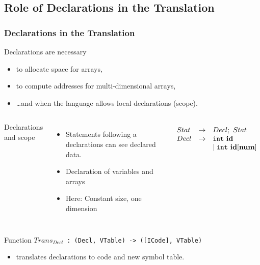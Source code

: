 \documentclass{beamer}
\newcommand{\codesize}{\footnotesize}
\newcommand{\cd}[1]{{{\codesize\tt #1}}}
\renewcommand{\emph}[1]{\textcolor{structure}{#1}}
\begin{document}
\subsection{Role of Declarations in the Translation}

\begin{frame}
	\tableofcontents[currentsubsection]
\end{frame}


\begin{frame}[fragile]
	\frametitle{Declarations in the Translation}

\emph{Declarations are necessary}

\begin{itemize}
\item to allocate space for arrays,
\item to compute addresses for multi-dimensional arrays,
\item \ldots and when the language allows \emph{local declarations (scope)}.
\end{itemize}

\pause

\begin{columns}

\emph{Declarations and scope}
\begin{itemize}
\item Statements following a declarations can see declared data.
\item Declaration of variables and arrays
\item Here: Constant size, one dimension
\end{itemize}


{\footnotesize

\renewcommand{\arraystretch}{0.9}
\[\begin{array}{lcl}
Stat & \rightarrow & Decl;~Stat\\
Decl & \rightarrow & {\tt int}~\mathbf{id}\\
& & \mid {\tt int}~\mathbf{id}[\mathbf{num}]\\
\end{array}\]
}
\end{columns}

\bigskip
Function $Trans_{Decl}$\cd{~:~(Decl, VTable) -> ([ICode], VTable)} 

\begin{itemize}
\item translates declarations to code and new symbol table.
\end{itemize}

\end{frame}
\end{document}
